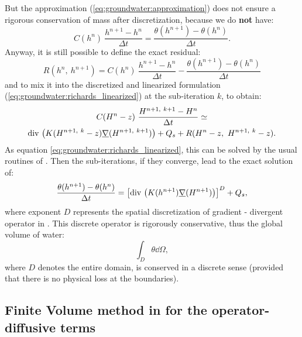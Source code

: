 But the approximation (\eqref{eq:groundwater:approximation}) does not ensure a rigorous conservation of mass after discretization, because we do \textbf{not} have:
$$C(h^{n}) \ \frac{h^{n+1} - h^n}{\Delta t} = \frac{\theta(h^{n+1}) - \theta(h^n)}{\Delta t}.$$
Anyway, it is still possible to define the exact residual:
\begin{equation}
\label{eq:groundwater:residual}
  R(h^n, \ h^{n+1}) = C(h^{n}) \ \frac{h^{n+1} - h^n}{\Delta t} - \frac{\theta(h^{n+1}) - \theta(h^n)}{\Delta t}
\end{equation}
and to mix it into the discretized and linearized formulation (\eqref{eq:groundwater:richards_linearized}) at the sub-iteration $k$, to obtain:
\begin{multline}
\label{eq:groundwater:richards_final}
 C(H^{n}-z) \ \frac{H^{ n+1, \ k+1} - H^n}{\Delta t} \simeq \\ \text{div}\, \left( K(H^{ n+1, \ k} - z) \underline{\nabla}(H^{ n+1, \ k+1}) \right) + Q_s + R(H^n - z, \ H^{ n+1, \ k} - z).
\end{multline}
As equation \eqref{eq:groundwater:richards_linearized}, this can be solved by the usual routines of \CS.
Then the sub-iterations, if they converge, lead to the exact solution of:
\begin{equation}
 \label{eq:groundwater:richards_final_bis}
\frac{ \theta(h^{n+1}) - \theta(h^n) }{\Delta t} = \left[ \text{div}\, \left( K(h^{n+1}) \underline{\nabla}(H^{n+1}) \right) \right]^D + Q_s,
\end{equation}
where exponent $D$ represents the spatial discretization of gradient - divergent operator in \CS.
This discrete operator
is rigorously conservative, thus the global volume of water:
$$\int_D{{\theta} \dd \Omega},$$
where $D$ denotes the entire domain, is conserved in a discrete sense (provided that there is no physical loss at the boundaries).

\subsection{Finite Volume method in \CS for the operator-diffusive terms}\label{sec:groundwater:operator_diffusive}

